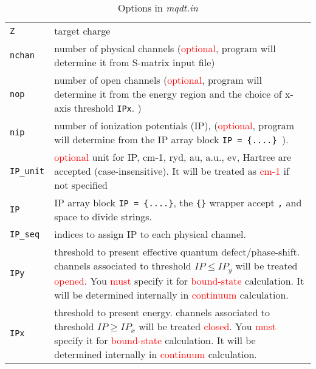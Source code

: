 \documentclass[11pt]{article}
\begin{document}
\begin{table}[]
\caption{Options in \emph{mqdt.in}}
\label{table:mqdt.in}
\begin{tabular}{|p{5cm}|p{10.5cm}|}
\hline
\verb|Z| & target charge \\
\verb|nchan|& number of physical channels (\textcolor{red}{optional}, program will determine it from S-matrix input file) \\
\verb|nop|& number of open channels (\textcolor{red}{optional}, program will determine it from the energy region and the choice of x-axis threshold \verb|IPx|. )\\
\verb|nip|& number of ionization potentials (IP), (\textcolor{red}{optional}, program will determine from the IP array block \verb|IP = {....} |).\\
\verb|IP_unit|& \textcolor{red}{optional} unit for IP, cm-1, ryd, au, a.u., ev, Hartree are accepted (case-insensitive). It will be treated as \textcolor{red}{cm-1} if not specified\\
\verb|IP|& IP array block \verb|IP = {....}|, the \verb|{}| wrapper accept \verb|,| and space to divide strings. \\
\verb|IP_seq|& indices to assign IP to each physical channel.\\

\verb|IPy|& threshold to present effective quantum defect/phase-shift. channels associated to threshold $IP \leq IP_y$ will be treated \textcolor{red}{opened}. You \textcolor{red}{must} specify it for \textcolor{red}{bound-state} calculation. It will be determined internally in \textcolor{red}{continuum} calculation.\\
\verb|IPx|& threshold to present energy. channels associated to threshold $IP \geq IP_x$ will be treated \textcolor{red}{closed}. You \textcolor{red}{must} specify it for \textcolor{red}{bound-state} calculation. It will be determined internally in \textcolor{red}{continuum} calculation.\\


\end{tabular}
\end{table}
\end{document}
